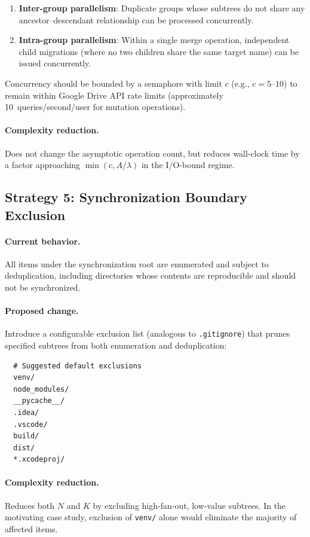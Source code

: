 \documentclass[12pt,a4paper]{article}
\begin{document}
\begin{enumerate}[nosep]
  \item \textbf{Inter-group parallelism}: Duplicate groups whose subtrees do not share any ancestor--descendant relationship can be processed concurrently.
  \item \textbf{Intra-group parallelism}: Within a single merge operation, independent child migrations (where no two children share the same target name) can be issued concurrently.
\end{enumerate}

Concurrency should be bounded by a semaphore with limit $c$ (e.g., $c = 5$--$10$) to remain within Google Drive API rate limits (approximately 10~queries/second/user for mutation operations).

\paragraph{Complexity reduction.} Does not change the asymptotic operation count, but reduces wall-clock time by a factor approaching $\min(c, A/\lambda)$ in the I/O-bound regime.

\subsection{Strategy 5: Synchronization Boundary Exclusion}

\paragraph{Current behavior.} All items under the synchronization root are enumerated and subject to deduplication, including directories whose contents are reproducible and should not be synchronized.

\paragraph{Proposed change.} Introduce a configurable exclusion list (analogous to \texttt{.gitignore}) that prunes specified subtrees from both enumeration and deduplication:

\begin{verbatim}
  # Suggested default exclusions
  venv/
  node_modules/
  __pycache__/
  .idea/
  .vscode/
  build/
  dist/
  *.xcodeproj/
\end{verbatim}

\paragraph{Complexity reduction.} Reduces both $N$ and $K$ by excluding high-fan-out, low-value subtrees. In the motivating case study, exclusion of \texttt{venv/} alone would eliminate the majority of affected items.
\end{document}
